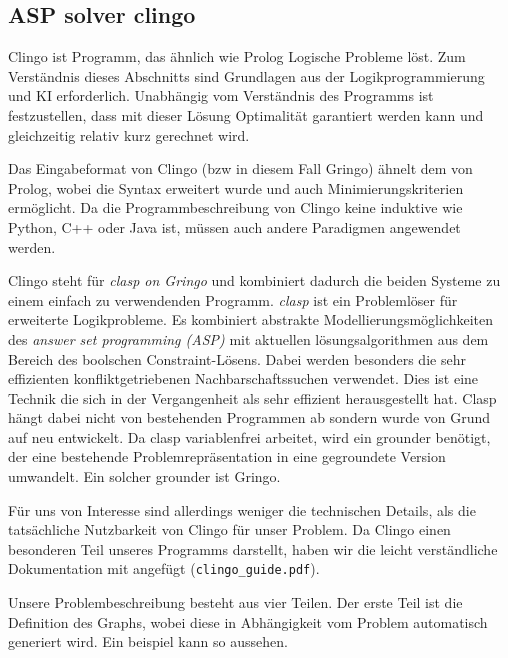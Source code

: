 ﻿\subsection{ASP solver clingo}

Clingo ist Programm, das ähnlich wie Prolog Logische Probleme löst. Zum Verständnis dieses Abschnitts sind Grundlagen aus der Logikprogrammierung und KI erforderlich. Unabhängig vom Verständnis des Programms ist festzustellen, dass mit dieser Lösung Optimalität garantiert werden kann und gleichzeitig relativ kurz gerechnet wird. 

Das Eingabeformat von Clingo (bzw in diesem Fall Gringo) ähnelt dem von Prolog, wobei die Syntax erweitert wurde und auch Minimierungskriterien ermöglicht. Da die Programmbeschreibung von Clingo keine induktive wie Python, C++ oder Java ist, müssen auch andere Paradigmen angewendet werden. 

Clingo steht für \emph{clasp on Gringo} und kombiniert dadurch die beiden Systeme zu einem einfach zu verwendenden Programm. \emph{clasp} ist ein Problemlöser für erweiterte Logikprobleme. Es kombiniert abstrakte Modellierungsmöglichkeiten des \emph{answer set programming (ASP)} mit aktuellen lösungsalgorithmen aus dem Bereich des boolschen Constraint-Lösens. Dabei werden besonders die sehr effizienten konfliktgetriebenen Nachbarschaftssuchen verwendet. Dies ist eine Technik die sich in der Vergangenheit als sehr effizient herausgestellt hat. Clasp hängt dabei nicht von bestehenden Programmen ab sondern wurde von Grund auf neu entwickelt. Da clasp variablenfrei arbeitet, wird ein grounder benötigt, der eine bestehende Problemrepräsentation in eine gegroundete Version umwandelt. Ein solcher grounder ist Gringo. 

Für uns von Interesse sind allerdings weniger die technischen Details, als die tatsächliche Nutzbarkeit von Clingo für unser Problem. Da Clingo einen besonderen Teil unseres Programms darstellt, haben wir die leicht verständliche Dokumentation mit angefügt (\texttt{clingo\_guide.pdf}).

Unsere Problembeschreibung besteht aus vier Teilen. Der erste Teil ist die Definition des Graphs, wobei diese in Abhängigkeit vom Problem automatisch generiert wird. Ein beispiel kann so aussehen.



